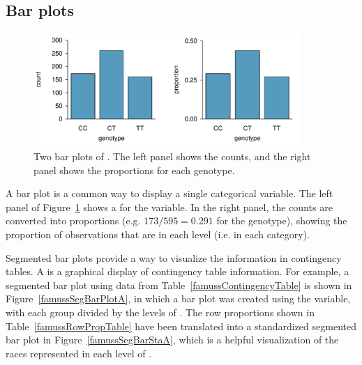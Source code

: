 \begin{doublespace}

\subsection{Bar plots}
\begin{figure}[h!]
	\centering
	\includegraphics[width=0.9\textwidth]{ch_intro_to_data_oi_biostat/figures/famussBarPlot/famussBarPlot}
	\caption{Two bar plots of . The left panel shows the counts, and the right panel shows the proportions for each genotype.}
	\label{famussBarPlot}
\end{figure}

A bar plot is a common way to display a single categorical variable. The left panel of Figure~\ref{famussBarPlot} shows a  for the  variable. In the right panel, the counts are converted into proportions (e.g. $173/595=0.291$ for the  genotype), showing the proportion of observations that are in each level (i.e. in each category).

Segmented bar plots provide a way to visualize the information in contingency tables. A  is a graphical display of contingency table information. For example, a segmented bar plot using data from Table~\ref{famussContingencyTable} is shown in Figure~\ref{famussSegBarPlotA}, in which a bar plot was created using the  variable, with each group divided by the levels of . The row proportions shown in Table~\ref{famussRowPropTable} have been translated into a standardized segmented bar plot in Figure~\ref{famussSegBarStaA}, which is a helpful visualization of the races represented in each level of .


\end{doublespace}
